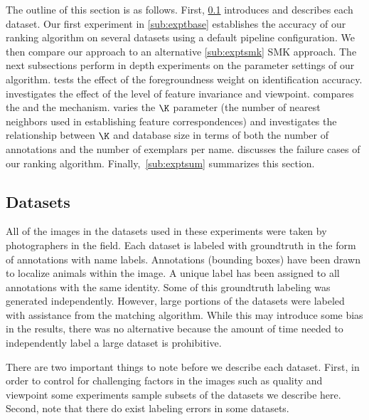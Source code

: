     The outline of this section is as follows.
    First, \cref{sub:datasets} introduces and describes each dataset.
    Our first experiment in \cref{sub:exptbase} establishes the accuracy of our ranking algorithm on several
      datasets using a default pipeline configuration.
    We then compare our approach to an alternative \cref{sub:exptsmk} SMK approach.
    The next subsections perform in depth experiments on the parameter settings of our algorithm.
     tests the effect of the foregroundness weight on identification accuracy.
     investigates the effect of the level of feature invariance and viewpoint.
     compares the \csumprefix{} and the \nsumprefix{} \namescoring{} mechanism.
     varies the $\K$ parameter (the number of nearest neighbors used in establishing feature
      correspondences) and investigates the relationship between $\K$ and database size in terms of both the number
      of annotations and the number of exemplars per name.
     discusses the failure cases of our ranking algorithm.
    Finally,~\cref{sub:exptsum} summarizes this section.


    \subsection{Datasets}\label{sub:datasets}

        All of the images in the datasets used in these experiments were taken by photographers in the field.
        Each dataset is labeled with groundtruth in the form of annotations with name labels.
        Annotations (bounding boxes) have been drawn to localize animals within the image.
        A unique \name{} label has been assigned to all annotations with the same identity.
        Some of this groundtruth labeling was generated independently.
        However, large portions of the datasets were labeled with assistance from the matching algorithm.
        While this may introduce some bias in the results, there was no alternative because the amount of time
          needed to independently label a large dataset is prohibitive.

        There are two important things to note before we describe each dataset.
        First, in order to control for challenging factors in the images such as quality and viewpoint some
          experiments sample subsets of the datasets we describe here.
        Second, note that there do exist labeling errors in some datasets.

